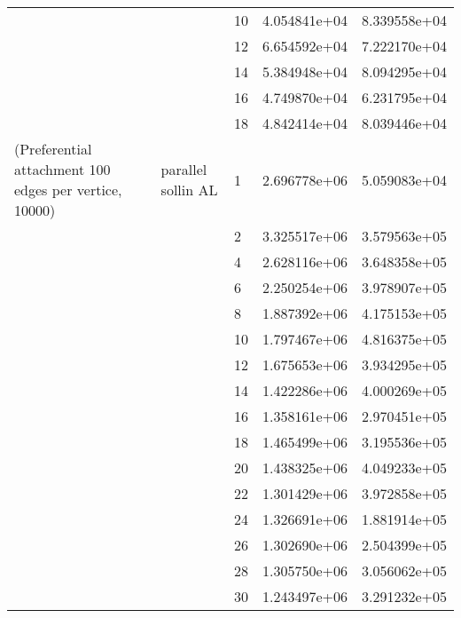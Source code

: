\begin{tabular}{lllrr}
                      &                     & 10 &  4.054841e+04 &  8.339558e+04 \\
                      &                     & 12 &  6.654592e+04 &  7.222170e+04 \\
                      &                     & 14 &  5.384948e+04 &  8.094295e+04 \\
                      &                     & 16 &  4.749870e+04 &  6.231795e+04 \\
                      &                     & 18 &  4.842414e+04 &  8.039446e+04 \\
(Preferential attachment 100 edges per vertice, 10000) & parallel sollin AL & 1  &  2.696778e+06 &  5.059083e+04 \\
                      &                     & 2  &  3.325517e+06 &  3.579563e+05 \\
                      &                     & 4  &  2.628116e+06 &  3.648358e+05 \\
                      &                     & 6  &  2.250254e+06 &  3.978907e+05 \\
                      &                     & 8  &  1.887392e+06 &  4.175153e+05 \\
                      &                     & 10 &  1.797467e+06 &  4.816375e+05 \\
                      &                     & 12 &  1.675653e+06 &  3.934295e+05 \\
                      &                     & 14 &  1.422286e+06 &  4.000269e+05 \\
                      &                     & 16 &  1.358161e+06 &  2.970451e+05 \\
                      &                     & 18 &  1.465499e+06 &  3.195536e+05 \\
                      &                     & 20 &  1.438325e+06 &  4.049233e+05 \\
                      &                     & 22 &  1.301429e+06 &  3.972858e+05 \\
                      &                     & 24 &  1.326691e+06 &  1.881914e+05 \\
                      &                     & 26 &  1.302690e+06 &  2.504399e+05 \\
                      &                     & 28 &  1.305750e+06 &  3.056062e+05 \\
                      &                     & 30 &  1.243497e+06 &  3.291232e+05 \\

\end{tabular}
